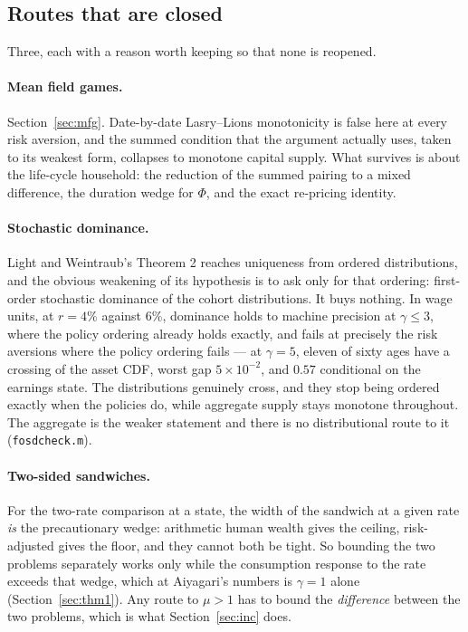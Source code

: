 \subsection{Routes that are closed}

Three, each with a reason worth keeping so that none is reopened.

\paragraph{Mean field games.} Section~\ref{sec:mfg}. Date-by-date Lasry--Lions monotonicity is false
here at every risk aversion, and the summed condition that the argument actually uses, taken to its
weakest form, collapses to monotone capital supply. What survives is about the life-cycle household:
the reduction of the summed pairing to a mixed difference, the duration wedge for $\Phi$, and the
exact re-pricing identity.

\paragraph{Stochastic dominance.} Light and Weintraub's Theorem 2 reaches uniqueness from ordered
distributions, and the obvious weakening of its hypothesis is to ask only for that ordering: first-order
stochastic dominance of the cohort distributions. It buys nothing. In wage units, at $r=4\%$ against
$6\%$, dominance holds to machine precision at $\gamma\le3$, where the policy ordering already holds
exactly, and fails at precisely the risk aversions where the policy ordering fails --- at $\gamma=5$,
eleven of sixty ages have a crossing of the asset CDF, worst gap $5\times10^{-2}$, and $0.57$
conditional on the earnings state. The distributions genuinely cross, and they stop being ordered
exactly when the policies do, while aggregate supply stays monotone throughout. The aggregate is the
weaker statement and there is no distributional route to it (\texttt{fosdcheck.m}).

\paragraph{Two-sided sandwiches.} For the two-rate comparison at a state, the width of the sandwich at
a given rate \emph{is} the precautionary wedge: arithmetic human wealth gives the ceiling,
risk-adjusted gives the floor, and they cannot both be tight. So bounding the two problems separately
works only while the consumption response to the rate exceeds that wedge, which at Aiyagari's numbers
is $\gamma=1$ alone (Section~\ref{sec:thm1}). Any route to $\mu>1$ has to bound the \emph{difference}
between the two problems, which is what Section~\ref{sec:inc} does.

